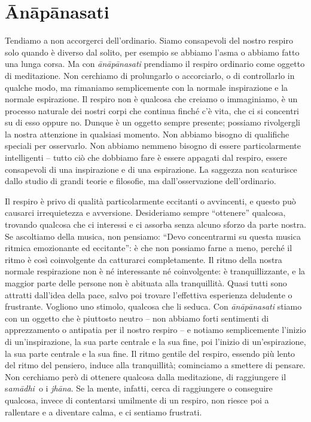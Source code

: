 \chapter{Ānāpānasati}

Tendiamo a non accorgerci dell'ordinario. Siamo consapevoli del nostro
respiro solo quando è diverso dal solito, per esempio se abbiamo l'asma
o abbiamo fatto una lunga corsa. Ma con \emph{ānāpānasati} prendiamo il
respiro ordinario come oggetto di meditazione. Non cerchiamo di
prolungarlo o accorciarlo, o di controllarlo in qualche modo, ma
rimaniamo semplicemente con la normale inspirazione e la normale
espirazione. Il respiro non è qualcosa che creiamo o immaginiamo, è un
processo naturale dei nostri corpi che continua finché c'è vita, che ci
si concentri su di esso oppure no. Dunque è un oggetto sempre presente;
possiamo rivolgergli la nostra attenzione in qualsiasi momento. Non
abbiamo bisogno di qualifiche speciali per osservarlo. Non abbiamo
nemmeno bisogno di essere particolarmente intelligenti -- tutto ciò che
dobbiamo fare è essere appagati dal respiro, essere consapevoli di una
inspirazione e di una espirazione. La saggezza non scaturisce dallo
studio di grandi teorie e filosofie, ma dall'osservazione
dell'ordinario.

Il respiro è privo di qualità particolarmente eccitanti o avvincenti, e
questo può causarci irrequietezza e avversione. Desideriamo sempre
``ottenere'' qualcosa, trovando qualcosa che ci interessi e ci assorba
senza alcuno sforzo da parte nostra. Se ascoltiamo della musica, non
pensiamo: ``Devo concentrarmi su questa musica ritmica emozionante ed
eccitante'': è che non possiamo farne a meno, perché il ritmo è così
coinvolgente da catturarci completamente. Il ritmo della nostra normale
respirazione non è né interessante né coinvolgente: è tranquillizzante,
e la maggior parte delle persone non è abituata alla tranquillità. Quasi
tutti sono attratti dall'idea della pace, salvo poi trovare l'effettiva
esperienza deludente o frustrante. Vogliono uno stimolo, qualcosa che li
seduca. Con \emph{ānāpānasati} stiamo con un oggetto che è piuttosto
neutro -- non abbiamo forti sentimenti di apprezzamento o antipatia per
il nostro respiro -- e notiamo semplicemente l'inizio di
un'inspirazione, la sua parte centrale e la sua fine, poi l'inizio di
un'espirazione, la sua parte centrale e la sua fine. Il ritmo gentile
del respiro, essendo più lento del ritmo del pensiero, induce alla
tranquillità; cominciamo a smettere di pensare. Non cerchiamo però di
ottenere qualcosa dalla meditazione, di raggiungere il s\emph{amādhi}~o
i \emph{jhāna}. Se la mente, infatti, cerca di raggiungere o conseguire
qualcosa, invece di contentarsi umilmente di un respiro, non riesce poi
a rallentare e a diventare calma, e ci sentiamo frustrati.

